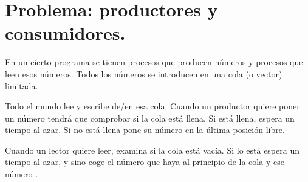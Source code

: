 \documentclass[letterpaper,10pt,spanish]{sphinxmanual}
\begin{document}
\begin{sphinxVerbatim}[commandchars=\\\{\}]
                     
                          
                    
                        \PYG{o}{[}\PYG{o}{]}
                        \PYG{o}{[}\PYG{o}{]}
         
 
\end{sphinxVerbatim}


\section{Problema: productores y consumidores.}
\label{\detokenize{textos/tema2:problema-productores-y-consumidores}}
En un cierto programa se tienen procesos que producen números y procesos que leen esos números. Todos los números se introducen en una cola (o vector) limitada.

Todo el mundo lee y escribe de/en esa cola. Cuando un productor quiere poner un número tendrá que comprobar si la cola está llena. Si está llena, espera un tiempo al azar. Si no está llena pone su número en la última posición libre.

Cuando un lector quiere leer, examina si la cola está vacía. Si lo está espera un tiempo al azar, y sino coge el número que haya al principio de la cola y ese número .
\end{document}
